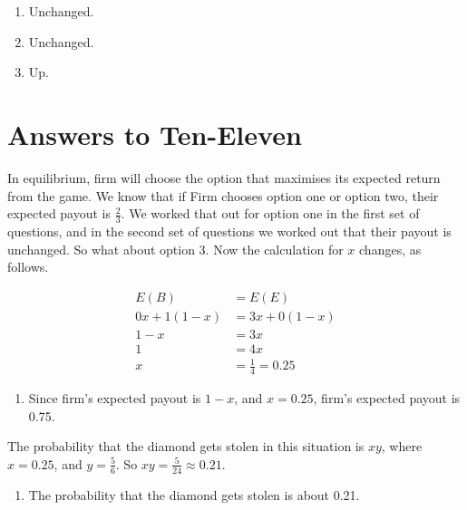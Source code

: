 \documentclass[
  10pt,
]{article}
\providecommand{\tightlist}{%
  \setlength{\itemsep}{0pt}\setlength{\parskip}{0pt}}
\begin{document}
\begin{enumerate}
\def\labelenumi{\arabic{enumi}.}
\setcounter{enumi}{6}
\tightlist
\item
  Unchanged.
\item
  Unchanged.
\item
  Up.
\end{enumerate}

\hypertarget{answers-to-ten-eleven}{%
\section{Answers to Ten-Eleven}\label{answers-to-ten-eleven}}

In equilibrium, firm will choose the option that maximises its expected
return from the game. We know that if Firm chooses option one or option
two, their expected payout is \(\frac{2}{3}\). We worked that out for
option one in the first set of questions, and in the second set of
questions we worked out that their payout is unchanged. So what about
option 3. Now the calculation for \(x\) changes, as follows.

\begin{align*}
E(B) &= E(E) \\
0x + 1(1-x) &= 3x + 0(1-x) \\
1-x &= 3x \\
1 &= 4x \\
x &= \frac{1}{4} = 0.25
\end{align*}

\begin{enumerate}
\def\labelenumi{\arabic{enumi}.}
\setcounter{enumi}{9}
\tightlist
\item
  Since firm's expected payout is \(1-x\), and \(x = 0.25\), firm's
  expected payout is 0.75.
\end{enumerate}

The probability that the diamond gets stolen in this situation is
\(xy\), where \(x = 0.25\), and \(y = \frac{5}{6}\). So
\(xy = \frac{5}{24} \approx 0.21\).

\begin{enumerate}
\def\labelenumi{\arabic{enumi}.}
\setcounter{enumi}{10}
\tightlist
\item
  The probability that the diamond gets stolen is about 0.21.
\end{enumerate}
\end{document}
